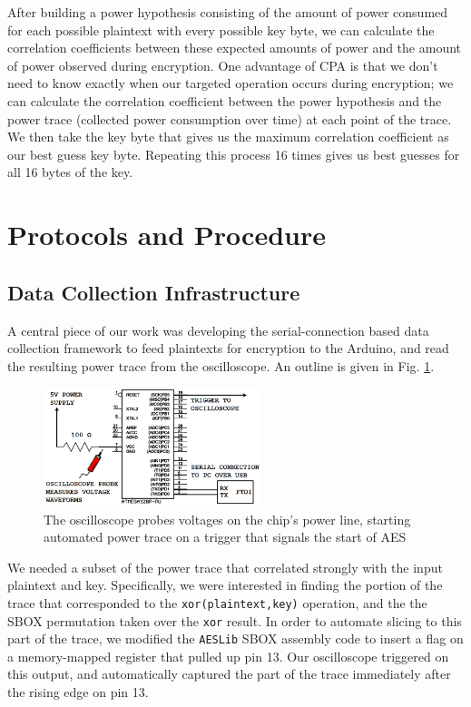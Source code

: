 \documentclass[journal]{ieee_style}
\begin{document}
After building a power hypothesis consisting of the amount of power consumed for each possible plaintext with every possible key byte, we can calculate the correlation coefficients between these expected amounts of power and the amount of power observed during encryption. One advantage of CPA is that we don't need to know exactly when our targeted operation occurs during encryption; we can calculate the correlation coefficient between the power hypothesis and the power trace (collected power consumption over time) at each point of the trace. We then take the key byte that gives us the maximum correlation coefficient as our best guess key byte. Repeating this process 16 times gives us best guesses for all 16 bytes of the key.


\section{Protocols and Procedure}
\subsection{Data Collection Infrastructure}
A central piece of our work was developing the serial-connection based data collection framework to feed plaintexts for encryption to the Arduino, and read the resulting power trace from the oscilloscope. An outline is given in Fig. \ref{fig_sim}.

\begin{figure}[!t]
\centering
\includegraphics[width=2.5in]{setup}
\caption{The oscilloscope probes voltages on the chip's power line, starting automated power trace on a trigger that signals the start of AES}
\label{fig_sim}
\end{figure}

We needed a subset of the power trace that correlated strongly with the input plaintext and key. Specifically, we were interested in finding the portion of the trace that corresponded to the \texttt{xor(plaintext,key)} operation, and the the SBOX permutation taken over the \texttt{xor} result. In order to automate slicing to this part of the trace, we modified the \texttt{AESLib} SBOX assembly code to insert a flag on a memory-mapped register that pulled up pin 13. Our oscilloscope triggered on this output, and automatically captured the part of the trace immediately after the rising edge on pin 13.
\end{document}

